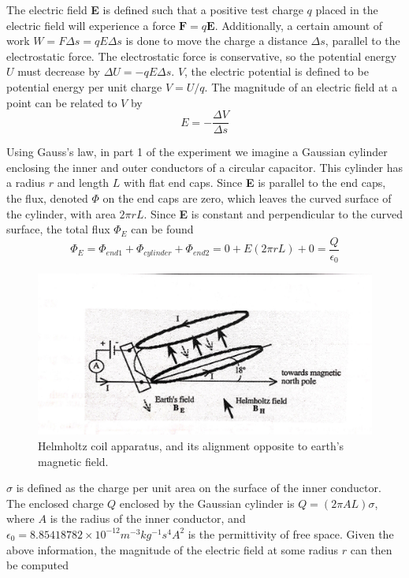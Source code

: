 \documentclass[letterpaper]{article}
\begin{document}
The electric field \textbf{E} is defined such that a positive test charge $q$
placed in the electric field will experience a force $\textbf{F}=q\textbf{E}$.
Additionally, a certain amount of work $W=F \Delta s=qE\Delta s$ is done to move the charge
a distance $\Delta s$, parallel to the electrostatic force. The electrostatic force is
conservative, so the potential energy $U$ must decrease by $\Delta U=-qE\Delta s$.
$V$, the electric potential is defined to be potential energy per unit charge $V=U/q$.
The magnitude of an electric field at a point can be related to $V$ by
\begin{equation}
  E=-\frac{\Delta V}{\Delta s} \label{eq1}
\end{equation}

Using Gauss's law, in part 1 of the experiment we imagine a Gaussian cylinder enclosing
the inner and outer conductors of a circular capacitor. This cylinder has a radius $r$ and
length $L$ with flat end caps. Since \textbf{E} is parallel to the end caps, the flux, denoted $\Phi$ on
the end caps are zero, which leaves the curved surface of the cylinder, with area $2\pi rL$.
Since \textbf{E} is constant and perpendicular to the curved surface, the total flux $\Phi_E$ can be found
\begin{equation}
  \Phi_E = \Phi_{end1} + \Phi_{cylinder} + \Phi_{end2} = 0+E(2\pi rL) + 0 =\frac{Q}{\epsilon_0}
\end{equation}
\begin{figure}[H]
    \centering
    \includegraphics[width=\textwidth]{fig1.jpg}
    \caption{Helmholtz coil apparatus, and its alignment opposite to earth's magnetic field. \cite{labmanual}}
\end{figure}

$\sigma$ is defined as the charge per unit area on the surface of the inner conductor.
The enclosed charge $Q$ enclosed by the Gaussian cylinder is $Q=(2 \pi AL)\sigma$, where
$A$ is the radius of the inner conductor, and $\epsilon_0=8.85418782 \times 10^{-12} m^{-3} kg^{-1} s^{4} A^{2}$ is the permittivity of free space.
Given the above information, the magnitude of the electric field at some radius $r$
can then be computed
\end{document}
